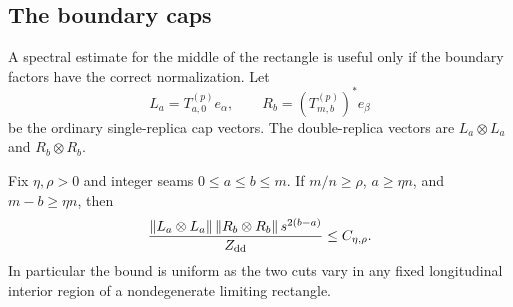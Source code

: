 \subsection{The boundary caps}

A spectral estimate for the middle of the rectangle is useful only if
the boundary factors have the correct normalization.  Let
\[
 L_a=T^{(p)}_{a,0}e_\alpha,
 \qquad R_b=(T^{(p)}_{m,b})^*e_\beta
\]
be the ordinary single-replica cap vectors.  The double-replica vectors
are $L_a\otimes L_a$ and $R_b\otimes R_b$.

\begin{lemma}\label{lem:cap-comparison}
Fix $\eta,\rho>0$ and integer seams $0\le a\le b\le m$.
If $m/n\ge\rho$, $a\ge\eta n$, and $m-b\ge\eta n$, then
\begin{equation}\label{eq:cap-comparison}
 \frac{\|L_a\otimes L_a\|\,
             \|R_b\otimes R_b\|\,s^{2(b-a)}}{Z_{\rm dd}}
 \le C_{\eta,\rho}.
\end{equation}
In particular the bound is uniform as the two cuts vary in any fixed
longitudinal interior region of a nondegenerate limiting rectangle.
\end{lemma}

